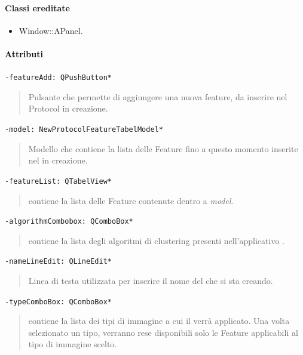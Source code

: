 \paragraph{Classi ereditate\\}
\begin{itemize}
\item Window::APanel.
\end{itemize}
\paragraph{\textcolor{black}{Attributi\\}}
\color{teal}\verb!-featureAdd: QPushButton*!
\begin{quote}
\color{black}Pulsante che permette di aggiungere una nuova feature, da inserire nel Protocol in creazione.
\end{quote}
\color{teal}\verb!-model: NewProtocolFeatureTabelModel*!
\begin{quote}
\color{black}Modello che contiene la lista delle Feature fino a questo momento inserite nel \protocol{} in creazione.
\end{quote}
\color{teal}\verb!-featureList: QTabelView*!
\begin{quote}
\color{black}contiene la lista delle Feature\g{} contenute dentro a \emph{model}. 
\end{quote}
\color{teal}\verb!-algorithmCombobox: QComboBox*!
\begin{quote}
\color{black}contiene la lista degli algoritmi di clustering\g{} presenti nell'applicativo \project{}. 
\end{quote}
\color{teal}\verb!-nameLineEdit: QLineEdit*!
\begin{quote}
\color{black}Linea di testa utilizzata per inserire il nome del \protocol{} che si sta creando. 
\end{quote}
\color{teal}\verb!-typeComboBox: QComboBox*!
\begin{quote}
\color{black}contiene la lista dei tipi di immagine a cui il \protocol{} verrà applicato. Una volta selezionato un tipo, verranno rese disponibili solo le Feature\g{} applicabili al tipo di immagine scelto.
\end{quote}

